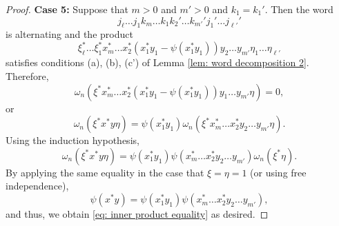 \documentclass[10pt]{amsart}
\numberwithin{equation}{section}
\theoremstyle{definition}
\begin{document}
\begin{proof}
\textbf{Case 5:} Suppose that $m > 0$ and $m' > 0$ and $k_1 = k_1'$.  Then the word
\[
j_\ell \dots j_1 k_m \dots k_1 k_2' \dots k_{m'}' j_1' \dots j_{\ell'}'
\]
is alternating and the product
\[
\xi_\ell^* \dots \xi_1^* x_m^* \dots x_2^* (x_1^*y_1 - \psi(x_1^*y_1)) y_2 \dots y_{m'} \eta_1 \dots \eta_{\ell'}
\]
satisfies conditions (a), (b), (c') of Lemma \ref{lem: word decomposition 2}.  Therefore,
\[
\omega_n(\xi^* x_m^* \dots x_2^* (x_1^*y_1 - \psi(x_1^*y_1)) y_1 \dots y_{m'} \eta) = 0,
\]
or
\[
\omega_n(\xi^* x^* y \eta) = \psi(x_1^*y_1) \omega_n(\xi^* x_m^* \dots x_2^* y_2 \dots y_{m'} \eta).
\]
Using the induction hypothesis,
\[
\omega_n(\xi^* x^* y \eta) = \psi(x_1^*y_1) \psi(x_m^* \dots x_2^* y_2 \dots y_{m'}) \omega_n(\xi^*\eta).
\]
By applying the same equality in the case that $\xi = \eta = 1$ (or using free independence),
\[
\psi(x^*y) = \psi(x_1^*y_1) \psi(x_m^* \dots x_2^* y_2 \dots y_{m'}),
\]
and thus, we obtain \eqref{eq: inner product equality} as desired.
\end{proof}
\end{document}
